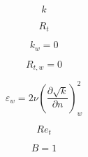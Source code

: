 {\newpage\clearpage
{}%
\begin{displaymath}
k
\end{displaymath}%
\lthtmldisplayZ
\lthtmlcheckvsize\clearpage}

{\newpage\clearpage
{}%
\begin{displaymath}
R_t
\end{displaymath}%
\lthtmldisplayZ
\lthtmlcheckvsize\clearpage}

{\newpage\clearpage
{}%
\begin{displaymath}
k_w = 0
\end{displaymath}%
\lthtmldisplayZ
\lthtmlcheckvsize\clearpage}

{\newpage\clearpage
{}%
\begin{displaymath}
R_{t,w} = 0
\end{displaymath}%
\lthtmldisplayZ
\lthtmlcheckvsize\clearpage}

{\newpage\clearpage
{}%
\begin{displaymath}
\varepsilon_w = 2 \nu \left(\frac{\partial \sqrt{k}}{\partial n} \right)_w^2
\end{displaymath}%
\lthtmldisplayZ
\lthtmlcheckvsize\clearpage}

{\newpage\clearpage
{}%
\begin{displaymath}
Re_t
\end{displaymath}%
\lthtmldisplayZ
\lthtmlcheckvsize\clearpage}

{\newpage\clearpage
{}%
\begin{displaymath}
B=1
\end{displaymath}%
\lthtmldisplayZ
\lthtmlcheckvsize\clearpage}



